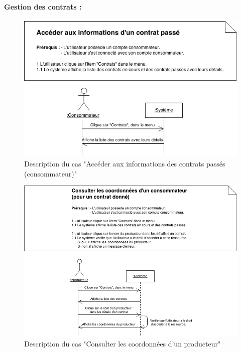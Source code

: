\documentclass[12pt]{report}
\begin{document}
\paragraph*{Gestion des contrats :}
\begin{figure}[!Hb]
\centering
\includegraphics[width=.8\textwidth]{./ressources/desc_UC_contrats_passes_conso.png}
\caption{Description du cas "Accéder aux informations des contrats passés (consommateur)"}
\vspace{100mm}
\end{figure}
\clearpage

\begin{figure}[!H]
\centering
\includegraphics[width=1.1\textwidth]{./ressources/desc_UC_coo_prod_contrats.png}
\caption{Description du cas "Consulter les coordonnées d'un producteur"}
\end{figure}
\clearpage
\end{document}

